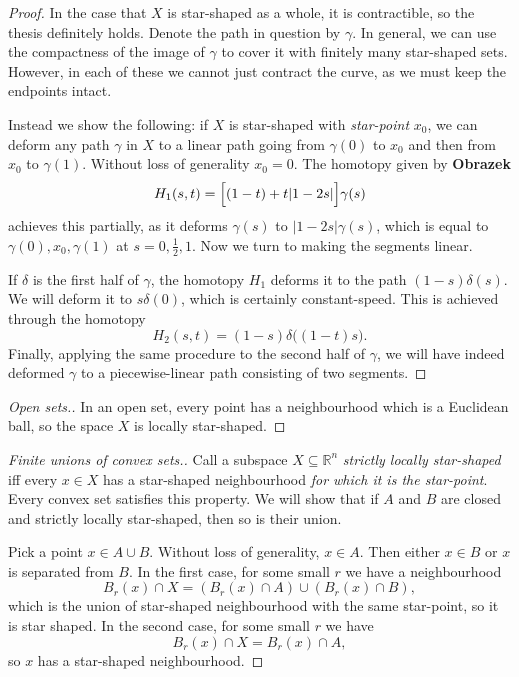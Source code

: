 \documentclass[11pt, a4paper, final]{amsart}
\newcommand\todo[1]{\textbf{\textcolor{redd}{#1}}}
\numberwithin{theorem}{section}
\theoremstyle{definition}
\theoremstyle{remark}
\begin{document}
\begin{proof}
In the case that \(X\) is star-shaped as a whole, it is contractible, so the thesis definitely holds. Denote the path in question by \(\gamma\). In general, we can use the compactness of the image of \( \gamma \) to cover it with finitely many star-shaped sets. However, in each of these we cannot just contract the curve, as we must keep the endpoints intact. 

Instead we show the following: if \(X\) is star-shaped with \emph{star-point} \(x_0\), we can deform any path \(\gamma\) in \(X\) to a linear path going from \(\gamma(0)\) to \(x_0\) and then from \(x_0\) to \( \gamma(1) \). Without loss of generality \(x_0 = 0\). The homotopy given by
\todo{Obrazek} 
\[
H_1(s,t) = \Bigl [ (1-t) + t|1 - 2s| \Bigr ] \gamma(s)
\]
achieves this partially, as it deforms \(\gamma(s)\) to \(|1 - 2s|\gamma(s)\), which is equal to \(\gamma(0), x_0, \gamma(1)\) at \(s=0, \frac{1}{2}, 1\). Now we turn to making the segments linear.

If \( \delta \) is the first half of \(\gamma\), the homotopy \(H_1\) deforms it to the path \((1-s)\delta(s)\). We will deform it to \(s\delta(0)\), which is certainly constant-speed. This is achieved through the homotopy
\[
H_2(s,t) = (1-s)\delta\bigl((1-t)s\bigr).
\]
Finally, applying the same procedure to the second half of \(\gamma\), we will have indeed deformed \(\gamma\) to a piecewise-linear path consisting of two segments. 
\end{proof}

\begin{proof}[Open sets.]
    In an open set, every point has a neighbourhood which is a Euclidean ball, so the space \(X\) is locally star-shaped.
\end{proof}

\begin{proof}[Finite unions of convex sets.] Call a subspace \(X \subseteq \mathbb{R}^n\) \emph{strictly locally star-shaped} iff every \(x \in X\) has a star-shaped neighbourhood \emph{for which it is the star-point}. Every convex set satisfies this property. We will show that if \(A\) and \(B\) are closed and strictly locally star-shaped, then so is their union.

Pick a point \( x \in A \cup B \). Without loss of generality, \( x \in A\). Then either \( x \in B\) or \( x \) is separated from \(B\). In the first case, for some small \( r \) we have a neighbourhood
\[
B_r(x) \cap X = (B_r(x) \cap A) \cup (B_r(x) \cap B),
\]
which is the union of star-shaped neighbourhood with the same star-point, so it is star shaped. In the second case, for some small \(r\) we have
\[
B_r(x) \cap X = B_r(x) \cap A,
\]
so \(x\) has a star-shaped neighbourhood.
\end{proof}
\end{document}
